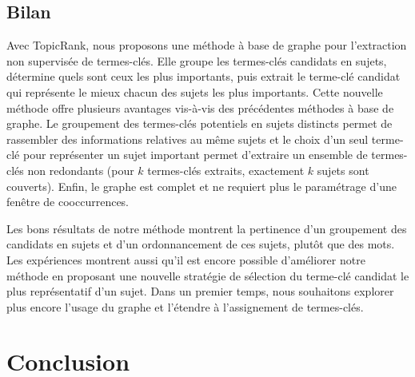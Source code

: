       \subsection{Bilan}
      \label{subsec:main:domain_independent_keyphrase_extraction-unsupervised_automatic_keyphrase_extraction-bilan}
        Avec TopicRank, nous proposons une méthode à base de graphe pour
        l'extraction non supervisée de termes-clés. Elle groupe les termes-clés
        candidats en sujets, détermine quels sont ceux les plus importants, puis
        extrait le terme-clé candidat qui représente le mieux chacun des sujets
        les plus importants. Cette nouvelle méthode offre plusieurs avantages
        vis-à-vis des précédentes méthodes à base de graphe. Le groupement des
        termes-clés potentiels en sujets distincts permet de rassembler des
        informations relatives au même sujets et le choix d'un seul terme-clé
        pour représenter un sujet important permet d'extraire un ensemble de
        termes-clés non redondants (pour $k$ termes-clés extraits, exactement
        $k$ sujets sont couverts). Enfin, le graphe est complet et ne requiert
        plus le paramétrage d'une fenêtre de cooccurrences.

        Les bons résultats de notre méthode montrent la pertinence d'un
        groupement des candidats en sujets et d'un ordonnancement de ces sujets,
        plutôt que des mots. Les expériences montrent aussi qu'il est encore
        possible d'améliorer notre méthode en proposant une nouvelle stratégie
        de sélection du terme-clé candidat le plus représentatif d'un sujet.
        Dans un premier temps, nous souhaitons explorer plus encore l'usage du
        graphe et l'étendre à l'assignement de termes-clés.


  \section{Conclusion}
  \label{sec:main-domain_independent_keyphrase_extraction-conclusion}
    \TODO{\dots}


